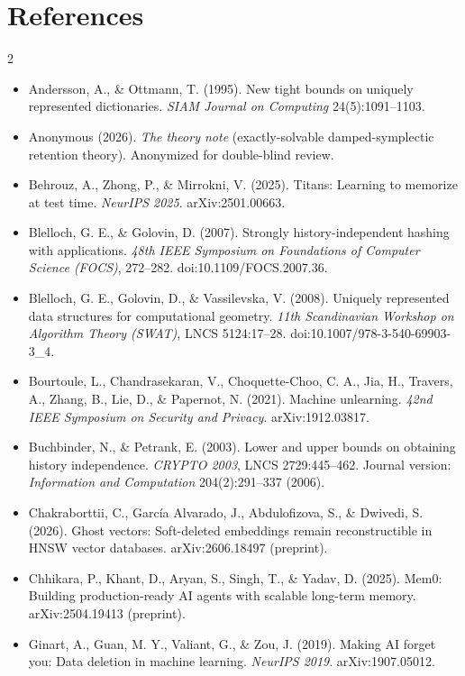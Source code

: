 \clearpage
\appendix
\scriptsize

\section*{References}
{\tiny\setlength{\columnsep}{14pt}\begin{multicols}{2}\begin{itemize}\itemsep0pt \parskip0pt 
\item Andersson, A., \& Ottmann, T. (1995). New tight bounds on uniquely represented dictionaries. \emph{SIAM Journal on Computing} 24(5):1091--1103.
\item Anonymous (2026). \emph{The theory note} (exactly-solvable damped-symplectic retention theory). Anonymized for double-blind review.
\item Behrouz, A., Zhong, P., \& Mirrokni, V. (2025). Titans: Learning to memorize at test time. \emph{NeurIPS 2025}. arXiv:2501.00663.
\item Blelloch, G. E., \& Golovin, D. (2007). Strongly history-independent hashing with applications. \emph{48th IEEE Symposium on Foundations of Computer Science (FOCS)}, 272--282. doi:10.1109/FOCS.2007.36.
\item Blelloch, G. E., Golovin, D., \& Vassilevska, V. (2008). Uniquely represented data structures for computational geometry. \emph{11th Scandinavian Workshop on Algorithm Theory (SWAT)}, LNCS 5124:17--28. doi:10.1007/978-3-540-69903-3\_4.
\item Bourtoule, L., Chandrasekaran, V., Choquette-Choo, C. A., Jia, H., Travers, A., Zhang, B., Lie, D., \& Papernot, N. (2021). Machine unlearning. \emph{42nd IEEE Symposium on Security and Privacy}. arXiv:1912.03817.
\item Buchbinder, N., \& Petrank, E. (2003). Lower and upper bounds on obtaining history independence. \emph{CRYPTO 2003}, LNCS 2729:445--462. Journal version: \emph{Information and Computation} 204(2):291--337 (2006).
\item Chakraborttii, C., Garc\'ia Alvarado, J., Abdulofizova, S., \& Dwivedi, S. (2026). Ghost vectors: Soft-deleted embeddings remain reconstructible in HNSW vector databases. arXiv:2606.18497 (preprint).
\item Chhikara, P., Khant, D., Aryan, S., Singh, T., \& Yadav, D. (2025). Mem0: Building production-ready AI agents with scalable long-term memory. arXiv:2504.19413 (preprint).
\item Ginart, A., Guan, M. Y., Valiant, G., \& Zou, J. (2019). Making AI forget you: Data deletion in machine learning. \emph{NeurIPS 2019}. arXiv:1907.05012.

\end{itemize}
\end{multicols}}
